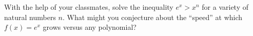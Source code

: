 {With the help of your classmates, solve the inequality $e^{x} > x^{n}$ for a variety of natural numbers $n$.  What might you conjecture about the ``speed'' at which $f(x) = e^{x}$ grows versus any polynomial?}
{}